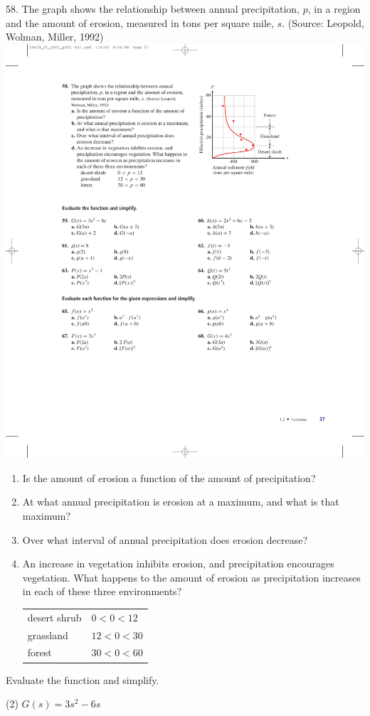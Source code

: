 \documentclass[10pt,]{book}
\theoremstyle{plain}
\theoremstyle{definition}
\theoremstyle{definition}
\theoremstyle{definition}
\newcommand{\lt}{<}
\begin{document}
\begin{exerciselist}
\begin{enumerate}[label=\alph*]
\end{enumerate}
%
\item[58.]\hypertarget{exercise-68}{}The graph shows the relationship between annual precipitation, \(p\), in a region and the amount of erosion, measured in tons per square mile, \(s\). (Source: Leopold, Wolman, Miller, 1992) \includegraphics[width=0.5\linewidth]{images/fig-ex-1-2-58}
 \leavevmode%
\begin{enumerate}[label=\alph*]
\item\hypertarget{li-240}{}Is the amount of erosion a function of the amount of precipitation?%
\item\hypertarget{li-241}{}At what annual precipitation is erosion at a maximum, and what is that maximum?%
\item\hypertarget{li-242}{}Over what interval of annual precipitation does erosion decrease?%
\item\hypertarget{li-243}{}An increase in vegetation inhibits erosion, and precipitation encourages vegetation. What happens to the amount of erosion as precipitation increases in each of these three environments? \begin{tabular}{ll}
desert shrub&\(0\lt 0\lt 12\)\tabularnewline[0pt]
grassland&\(12\lt 0\lt 30\)\tabularnewline[0pt]
forest&\(30\lt 0\lt 60\)
\end{tabular}
%
\end{enumerate}
%
\par\smallskip
\hypertarget{exercisegroup-7}{}\par\noindent Evaluate the function and simplify.%
\begin{exercisegroup}(2)
\exercise[59.]\hypertarget{exercise-69}{}\(G(s) = 3s^2 - 6s\) \leavevmode%
\begin{multicols}{2}
\begin{enumerate}[label=\alph*]

\end{enumerate}
\end{multicols}
\end{exercisegroup}
\end{exerciselist}
\end{document}
